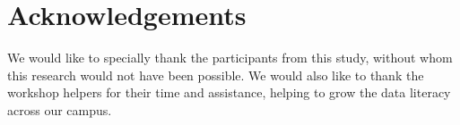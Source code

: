 \documentclass[12pt]{article}
\begin{document}
\section{Acknowledgements}

We would like to specially thank the participants from this study, without whom this research would not have been possible. We would also like to thank the workshop helpers for their time and assistance, helping to grow the data literacy across our campus. 




\end{document}

